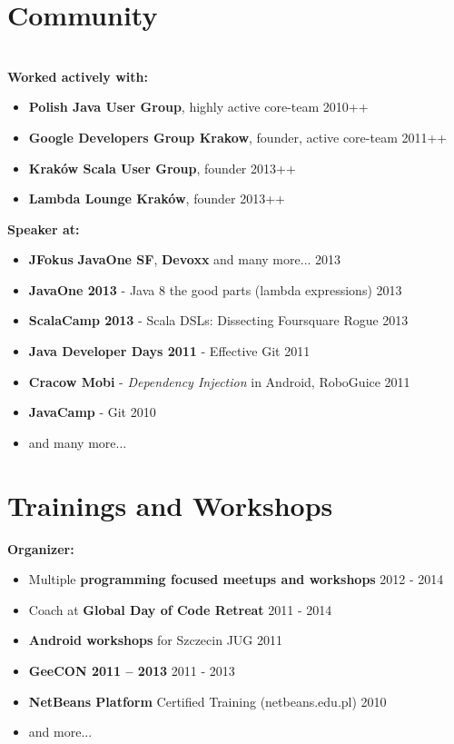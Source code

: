 \documentclass{res}
\begin{document}
\begin{resume}
\section{Community}
\\ 
\textbf{Worked actively with:}
\begin{itemize}
  \item \textbf{Polish Java User Group}, highly active core-team             \hfill 2010++
  \item \textbf{Google Developers Group Krakow}, founder, active core-team   \hfill 2011++
  \item \textbf{Kraków Scala User Group}, founder                            \hfill 2013++
  \item \textbf{Lambda Lounge Kraków}, founder                               \hfill 2013++
\end{itemize}
  
\textbf{Speaker at:}
\begin{itemize}
 \item \textbf{JFokus} \textbf{JavaOne SF}, \textbf{Devoxx} and many more...    \hfill 2013
 \item \textbf{JavaOne 2013} - Java 8 the good parts (lambda expressions) \hfill 2013
 \item \textbf{ScalaCamp 2013} - Scala DSLs: Dissecting Foursquare Rogue    \hfill 2013
 \item \textbf{Java Developer Days 2011} - Effective Git    \hfill 2011
 \item \textbf{Cracow Mobi} - \textit{Dependency Injection} in Android, RoboGuice    \hfill 2011
 \item \textbf{JavaCamp} - Git    \hfill 2010
 \item and many more...
\end{itemize}

\section{Trainings and Workshops}
{\bf Organizer:}
\begin{itemize}
 \item Multiple \textbf{programming focused meetups and workshops} \hfill 2012 - 2014
 \item Coach at \textbf{Global Day of Code Retreat} \hfill 2011 - 2014
 \item \textbf{Android workshops} for Szczecin JUG \hfill 2011
 \item \textbf{GeeCON 2011 -- 2013} \hfill 2011 - 2013
 \item \textbf{NetBeans Platform} Certified Training (netbeans.edu.pl) \hfill 2010 \\
 \item and more...
\end{itemize}


\end{resume}
\end{document}
